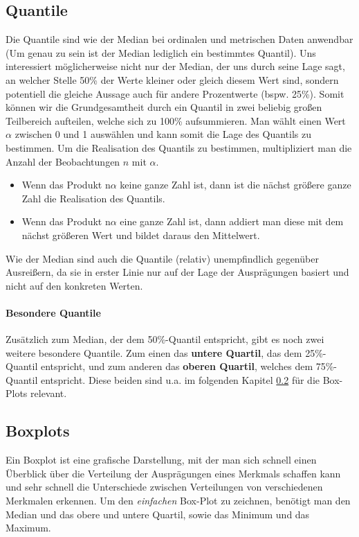 \documentclass[a4paper]{article}
\begin{document}
\subsection{Quantile}\label{sec:Quantile}
Die Quantile sind wie der Median bei ordinalen und metrischen Daten anwendbar (Um genau zu sein ist der Median lediglich ein bestimmtes Quantil). Uns interessiert möglicherweise nicht nur der Median, der uns durch seine Lage sagt, an welcher Stelle 50\% der Werte kleiner oder gleich diesem Wert sind, sondern potentiell die gleiche Aussage auch für andere Prozentwerte (bspw. 25\%). Somit können wir die Grundgesamtheit durch ein Quantil in zwei beliebig großen Teilbereich aufteilen, welche sich zu 100\% aufsummieren. Man wählt einen Wert $\alpha$ zwischen 0 und 1 auswählen und kann somit die Lage des Quantils zu bestimmen. Um die Realisation des Quantils zu bestimmen, multipliziert man die Anzahl der Beobachtungen $n$ mit $\alpha$.
\begin{itemize}
    \item Wenn das Produkt n$\alpha$ keine ganze Zahl ist, dann ist die nächst größere ganze Zahl die Realisation des Quantils.
    \item Wenn das Produkt n$\alpha$ eine ganze Zahl ist, dann addiert man diese mit dem nächst größeren Wert und bildet daraus den Mittelwert.
\end{itemize}
Wie der Median sind auch die Quantile (relativ) unempfindlich gegenüber Ausreißern, da sie in erster Linie nur auf der Lage der Ausprägungen basiert und nicht auf den konkreten Werten.\\

\noindent {}

\paragraph{Besondere Quantile}
Zusätzlich zum Median, der dem 50\%-Quantil entspricht, gibt es noch zwei weitere besondere Quantile. Zum einen das \textbf{untere Quartil}, das dem 25\%-Quantil entspricht, und zum anderen das \textbf{oberen Quartil}, welches dem 75\%-Quantil entspricht. Diese beiden sind u.a. im folgenden Kapitel \ref{sec:Box-Plot} für die Box-Plots relevant.

\subsection{Boxplots} \label{sec:Box-Plot}
Ein Boxplot ist eine grafische Darstellung, mit der man sich schnell einen Überblick über die Verteilung der Ausprägungen eines Merkmals schaffen kann und sehr schnell die Unterschiede zwischen Verteilungen von verschiedenen Merkmalen erkennen. 
Um den \textit{einfachen} Box-Plot zu zeichnen, benötigt man den Median und das obere und untere Quartil, sowie das Minimum und das Maximum.
\end{document}
